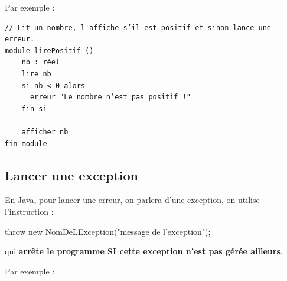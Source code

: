 \documentclass[11pt,a4paper]{article}
\begin{document}
            \par
        
          Par exemple : 
        
            \par
        \begin{verbatim}
// Lit un nombre, l'affiche s’il est positif et sinon lance une erreur.
module lirePositif ()
    nb : réel
    lire nb
    si nb < 0 alors
      erreur "Le nombre n’est pas positif !"
    fin si
    
    afficher nb
fin module
        \end{verbatim}\subsection{Lancer une exception}En Java, pour lancer une erreur, on parlera d'une exception, on utilise l'instruction : 
            \par
        \begin{Java}
throw new NomDeLException("message de l'exception");
        \end{Java}qui \textbf{arr\^ete le programme SI cette exception n'est pas g\'er\'ee ailleurs}.
            \par
        
          Par exemple : 
        
\end{document}
